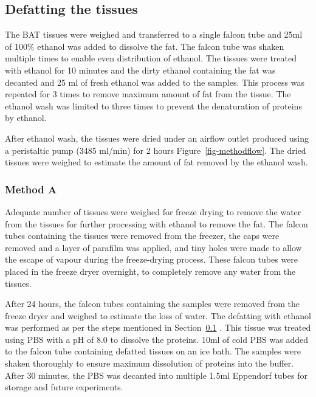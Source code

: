 \documentclass[
  letterpaper,
  DIV=11,
  numbers=noendperiod]{scrreprt}
\begin{document}
\subsection{\texorpdfstring{\textbf{Defatting the
tissues}}{Defatting the tissues}}\label{sec-defatting-the-tissues}

The BAT tissues were weighed and transferred to a single falcon tube and
25ml of 100\% ethanol was added to dissolve the fat. The falcon tube was
shaken multiple times to enable even distribution of ethanol. The
tissues were treated with ethanol for 10 minutes and the dirty ethanol
containing the fat was decanted and 25 ml of fresh ethanol was added to
the samples. This process was repeated for 3 times to remove maximum
amount of fat from the tissue. The ethanol wash was limited to three
times to prevent the denaturation of proteins by ethanol. ~

After ethanol wash, the tissues were dried under an airflow outlet
produced using a peristaltic pump (3485 ml/min) for 2 hours
Figure~\ref{fig-methodflow}. The dried tissues were weighed to estimate
the amount of fat removed by the ethanol wash.

\subsubsection{\texorpdfstring{\textbf{Method
A}}{Method A}}\label{sec-method-a}

Adequate number of tissues were weighed for freeze drying to remove the
water from the tissues for further processing with ethanol to remove the
fat. The falcon tubes containing the tissues were removed from the
freezer, the caps were removed and a layer of parafilm was applied, and
tiny holes were made to allow the escape of vapour during the
freeze-drying process. These falcon tubes were placed in the freeze
dryer overnight, to completely remove any water from the tissues.~

After 24 hours, the falcon tubes containing the samples were removed
from the freeze dryer and weighed to estimate the loss of water. The
defatting with ethanol was performed as per the steps mentioned in
Section~\ref{sec-defatting-the-tissues} . This tissue was treated using
PBS with a pH of 8.0 to dissolve the proteins. 10ml of cold PBS was
added to the falcon tube containing defatted tissues on an ice bath. The
samples were shaken thoroughly to ensure maximum dissolution of proteins
into the buffer. After 30 minutes, the PBS was decanted into multiple
1.5ml Eppendorf tubes for storage and future experiments.
\end{document}
